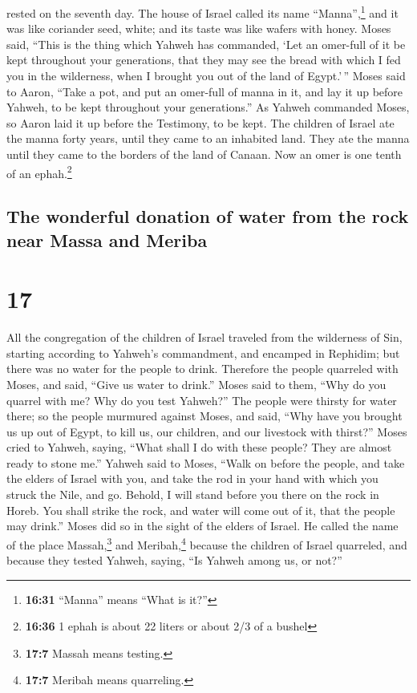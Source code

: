 rested on the seventh day.  The house of Israel called
its name ``Manna'',\footnote{\textbf{16:31} ``Manna'' means ``What is
  it?''} and it was like coriander seed, white; and its taste was like
wafers with honey.  Moses said, ``This is the thing which
Yahweh has commanded, `Let an omer-full of it be kept throughout your
generations, that they may see the bread with which I fed you in the
wilderness, when I brought you out of the land of Egypt.'\,''
 Moses said to Aaron, ``Take a pot, and put an omer-full
of manna in it, and lay it up before Yahweh, to be kept throughout your
generations.''  As Yahweh commanded Moses, so Aaron laid
it up before the Testimony, to be kept.  The children of
Israel ate the manna forty years, until they came to an inhabited land.
They ate the manna until they came to the borders of the land of Canaan.
 Now an omer is one tenth of an ephah.\footnote{\textbf{16:36}
  1 ephah is about 22 liters or about 2/3 of a bushel}

\hypertarget{the-wonderful-donation-of-water-from-the-rock-near-massa-and-meriba}{%
\subsection{The wonderful donation of water from the rock near Massa and
Meriba}\label{the-wonderful-donation-of-water-from-the-rock-near-massa-and-meriba}}

\hypertarget{section-16}{%
\section{17}\label{section-16}}

 All the congregation of the children of Israel traveled
from the wilderness of Sin, starting according to Yahweh's commandment,
and encamped in Rephidim; but there was no water for the people to
drink.  Therefore the people quarreled with Moses, and
said, ``Give us water to drink.'' Moses said to them, ``Why do you
quarrel with me? Why do you test Yahweh?''  The people
were thirsty for water there; so the people murmured against Moses, and
said, ``Why have you brought us up out of Egypt, to kill us, our
children, and our livestock with thirst?''  Moses cried to
Yahweh, saying, ``What shall I do with these people? They are almost
ready to stone me.''  Yahweh said to Moses, ``Walk on
before the people, and take the elders of Israel with you, and take the
rod in your hand with which you struck the Nile, and go. 
Behold, I will stand before you there on the rock in Horeb. You shall
strike the rock, and water will come out of it, that the people may
drink.'' Moses did so in the sight of the elders of Israel.
 He called the name of the place Massah,\footnote{\textbf{17:7}
  Massah means testing.} and Meribah,\footnote{\textbf{17:7} Meribah
  means quarreling.} because the children of Israel quarreled, and
because they tested Yahweh, saying, ``Is Yahweh among us, or not?''

